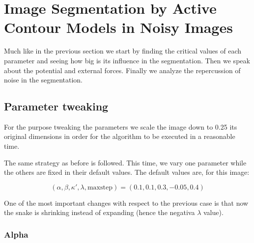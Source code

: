 \section{Image Segmentation by Active Contour Models in Noisy Images}

Much like in the previous section we start by finding the critical values
of each parameter and seeing how big is its influence in the segmentation.
Then we speak about the potential and external forces. Finally we analyze the
repercussion of noise in the segmentation.

\subsection{Parameter tweaking}

For the purpose tweaking the parameters we scale the image down to 0.25 its original
dimensions in order for the algorithm to be executed in a reasonable time.

The same strategy as before is followed. This time, we vary one parameter while the
others are fixed in their default values. The default values are, for this image:

\[ (\alpha , \beta , \kappa' , \lambda , \mathrm{maxstep} ) = (0.1, 0.1, 0.3, -0.05, 0.4) \]

One of the most important changes with respect to the previous case is that now the snake is
shrinking instead of expanding (hence the negativa $ \lambda $ value).

\subsubsection{Alpha}

